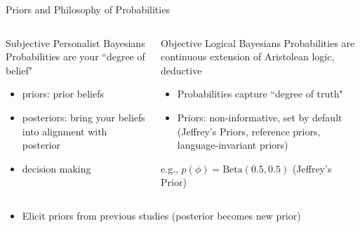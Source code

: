 \documentclass[presentation,9pt,xcolor=dvipsnames]{beamer}
\begin{document}
\begin{frame}[label={sec:org266eb97}]{Priors and Philosophy of Probabilities}
\begin{columns}
\begin{column}{0.4\columnwidth}
\begin{block}{Subjective Personalist Bayesians}
Probabilities are your ``degree of belief"
\begin{itemize}
\item priors: prior beliefs
\item posteriors: bring your beliefs into alignment with posterior
\item \alert{decision making}
\end{itemize}
\end{block}
\end{column}
\begin{column}{0.6\columnwidth}
\begin{block}{Objective Logical Bayesians}
Probabilities are continuous extension of Aristolean logic, deductive
\begin{itemize}
\item Probabilities capture ``degree of truth"
\item Priors: non-informative, set by \alert{default} (Jeffrey's Priors, reference priors, language-invariant priors)
\end{itemize}
e.g., \(p(\phi)=\text{Beta}(0.5,0.5)\) (Jeffrey's Prior)
\end{block}
\end{column}
\end{columns}
\begin{block}{}
\begin{itemize}
\item Elicit priors from previous studies (posterior becomes new prior)
\end{itemize}
\end{block}
\end{frame}
\end{document}
